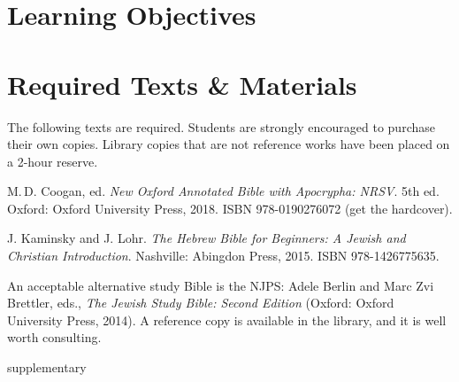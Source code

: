\documentclass[titlepage]{article}
\newcommand\incl{../includes}
\begin{document}


  \section{Learning Objectives}
  \label{objectives}

  \edobject

\section{Required Texts \& Materials}
\label{texts}

The following texts are required. Students are strongly encouraged to
purchase their own copies. Library copies that are not reference works
have been placed on a 2-hour reserve.

\begingroup
\renewcommand{\section}[2]{}%
\begin{thebibliography}{NRSV}%

	 M.\,D. Coogan, ed.
    \emph{New Oxford Annotated Bible with Apocrypha: NRSV}. 5th ed.
    Oxford: Oxford University Press, 2018.
    ISBN 978-0190276072 (get the hardcover).

	 J. Kaminsky and J. Lohr.
	\emph{The Hebrew Bible for Beginners: A Jewish and Christian Introduction}.
	Nashville: Abingdon Press, 2015.
	ISBN 978-1426775635.



\end{thebibliography}
\endgroup

An acceptable alternative study Bible is the NJPS: Adele Berlin and Marc
Zvi Brettler, eds., \emph{The Jewish Study Bible: Second Edition}
(Oxford: Oxford University Press, 2014). A reference copy is
available in the library, and it is well worth consulting.

\section{Supplementary Texts}
\label{supplementary}
\end{document}
